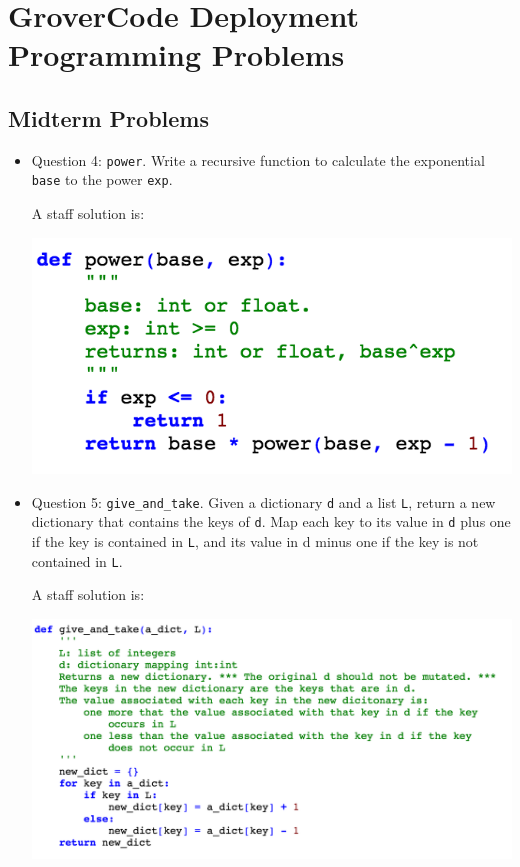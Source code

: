 \chapter{GroverCode Deployment Programming Problems}
\section{Midterm Problems}

\begin{itemize}
\item Question 4: \texttt{power}. Write a recursive function to calculate the exponential \texttt{base} to the power \texttt{exp}. 

A staff solution is:

\includegraphics[scale=0.65]{Body/figures/grovercode/fig_power}

\item Question 5: \texttt{give\_and\_take}. Given a dictionary \texttt{d} and a list \texttt{L}, return a new dictionary that contains the keys of \texttt{d}. Map each key to its value in \texttt{d} plus one if the key is contained in \texttt{L}, and its value in d minus one if the key is not contained in \texttt{L}. 

A staff solution is:

\includegraphics[scale=0.65]{Body/figures/grovercode/fig_give_and_take}


\end{itemize}
